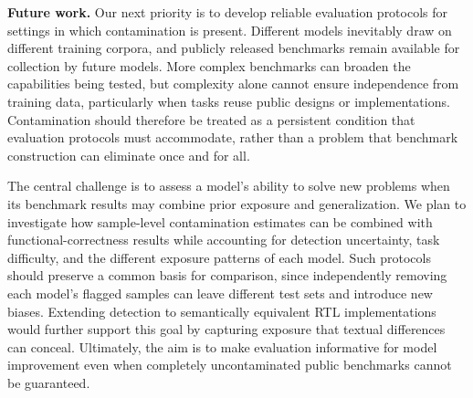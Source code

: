 \textbf{Future work.}
Our next priority is to develop reliable evaluation protocols for settings in which contamination is present. Different models inevitably draw on different training corpora, and publicly released benchmarks remain available for collection by future models. More complex benchmarks can broaden the capabilities being tested, but complexity alone cannot ensure independence from training data, particularly when tasks reuse public designs or implementations. Contamination should therefore be treated as a persistent condition that evaluation protocols must accommodate, rather than a problem that benchmark construction can eliminate once and for all.

The central challenge is to assess a model's ability to solve new problems when its benchmark results may combine prior exposure and generalization. We plan to investigate how sample-level contamination estimates can be combined with functional-correctness results while accounting for detection uncertainty, task difficulty, and the different exposure patterns of each model. Such protocols should preserve a common basis for comparison, since independently removing each model's flagged samples can leave different test sets and introduce new biases. Extending detection to semantically equivalent RTL implementations would further support this goal by capturing exposure that textual differences can conceal. Ultimately, the aim is to make evaluation informative for model improvement even when completely uncontaminated public benchmarks cannot be guaranteed.

